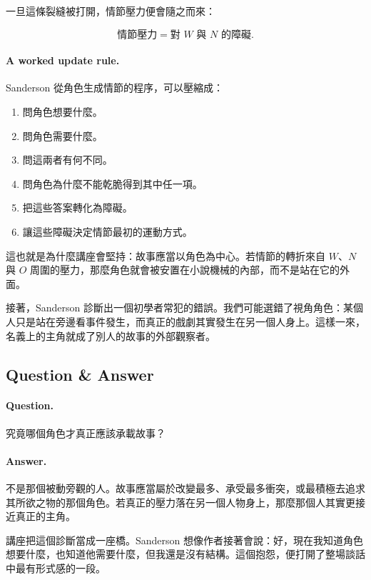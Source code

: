 一旦這條裂縫被打開，情節壓力便會隨之而來：

\begin{equation}
\text{情節壓力} = \text{對 } W \text{ 與 } N \text{ 的障礙}.
\end{equation}

\paragraph{A worked update rule.} Sanderson 從角色生成情節的程序，可以壓縮成：
\begin{enumerate}
\item 問角色想要什麼。
\item 問角色需要什麼。
\item 問這兩者有何不同。
\item 問角色為什麼不能乾脆得到其中任一項。
\item 把這些答案轉化為障礙。
\item 讓這些障礙決定情節最初的運動方式。
\end{enumerate}

這也就是為什麼講座會堅持：故事應當以角色為中心。若情節的轉折來自 \(W\)、\(N\) 與 \(O\) 周圍的壓力，那麼角色就會被安置在小說機械的內部，而不是站在它的外面。

接著，Sanderson 診斷出一個初學者常犯的錯誤。我們可能選錯了視角角色：某個人只是站在旁邊看事件發生，而真正的戲劇其實發生在另一個人身上。這樣一來，名義上的主角就成了別人的故事的外部觀察者。

\subsection{Question \& Answer}

\paragraph{Question.} 究竟哪個角色才真正應該承載故事？

\paragraph{Answer.} 不是那個被動旁觀的人。故事應當屬於改變最多、承受最多衝突，或最積極去追求其所欲之物的那個角色。若真正的壓力落在另一個人物身上，那麼那個人其實更接近真正的主角。

講座把這個診斷當成一座橋。Sanderson 想像作者接著會說：好，現在我知道角色想要什麼，也知道他需要什麼，但我還是沒有結構。這個抱怨，便打開了整場談話中最有形式感的一段。

